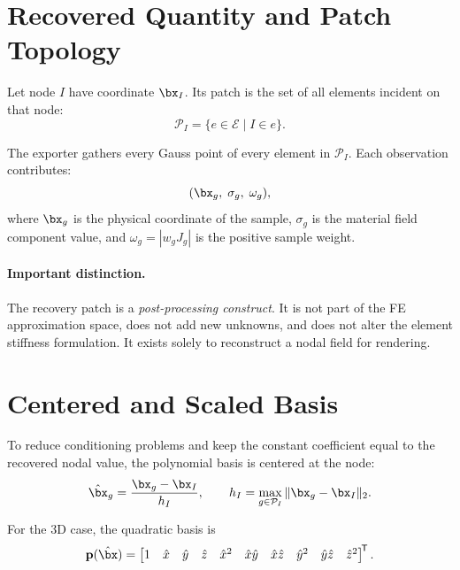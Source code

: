 \section{Recovered Quantity and Patch Topology}
\label{sec:patch_quantity}

Let node $I$ have coordinate $\bx_I$.  Its patch is the set of all elements
incident on that node:
\begin{equation}
  \mathcal{P}_I = \{ e \in \mathcal{E} \mid I \in e \}.
\end{equation}

The exporter gathers every Gauss point of every element in $\mathcal{P}_I$.
Each observation contributes:
\begin{equation}
  (\bx_g,\; \sigma_g,\; \omega_g),
\end{equation}
where $\bx_g$ is the physical coordinate of the sample, $\sigma_g$ is the
material field component value, and $\omega_g = |w_g J_g|$ is the positive
sample weight.

\paragraph{Important distinction.}
The recovery patch is a \emph{post-processing construct}.  It is not part of
the FE approximation space, does not add new unknowns, and does not alter the
element stiffness formulation.  It exists solely to reconstruct a nodal field
for rendering.


\section{Centered and Scaled Basis}
\label{sec:patch_basis}

To reduce conditioning problems and keep the constant coefficient equal to the
recovered nodal value, the polynomial basis is centered at the node:
\begin{equation}
  \hat{\bx}_g = \frac{\bx_g - \bx_I}{h_I},
  \qquad
  h_I = \max_{g \in \mathcal{P}_I} \|\bx_g - \bx_I\|_2.
\end{equation}

For the 3D case, the quadratic basis is
\begin{equation}
  \mathbf{p}(\hat{\bx}) =
  \begin{bmatrix}
  1 &
  \hat{x} &
  \hat{y} &
  \hat{z} &
  \hat{x}^2 &
  \hat{x}\hat{y} &
  \hat{x}\hat{z} &
  \hat{y}^2 &
  \hat{y}\hat{z} &
  \hat{z}^2
  \end{bmatrix}^{\!\mathsf{T}}.
\end{equation}

